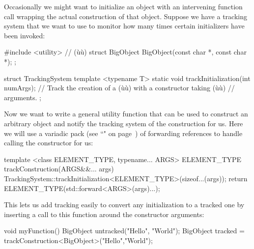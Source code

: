 Occasionally we might want to initialize an object with an intervening
function call wrapping the actual construction of that object. Suppose
we have a tracking system that we want to use to monitor how many times
certain initializers have been invoked:

\begin{emcppshiddenlisting}[emcppsbatch=e10]
#include <utility>      // (ù{}ù)
struct BigObject {
    BigObject(const char *, const char *);
};
\end{emcppshiddenlisting}
\begin{emcppslisting}[emcppsbatch=e10]
struct TrackingSystem
{
    template <typename T>
    static void trackInitialization(int numArgs);
        // Track the creation of a (ù{}ù) with a constructor taking (ù{}ù)
        // arguments.
};
\end{emcppslisting}

\noindent Now we want to write a general utility function that can be used to
construct an arbitrary object and notify the tracking system of the
construction for us. Here we will use a variadic pack (see
``" on page~\pageref{variable-templates}) of forwarding references to handle
calling the constructor for us:

\begin{emcppslisting}[emcppsbatch=e10]
template <class ELEMENT_TYPE, typename... ARGS>
ELEMENT_TYPE trackConstruction(ARGS&&... args)
{
    TrackingSystem::trackInitialization<ELEMENT_TYPE>(sizeof...(args));
    return ELEMENT_TYPE(std::forward<ARGS>(args)...);
}
\end{emcppslisting}

\noindent This lets us add tracking easily to convert any initialization to a
tracked one by inserting a call to this function around the constructor
arguments:

\begin{emcppslisting}[emcppsbatch=e10]
void myFunction()
{
    BigObject untracked("Hello", "World");
    BigObject tracked = trackConstruction<BigObject>("Hello","World");
}
\end{emcppslisting}

